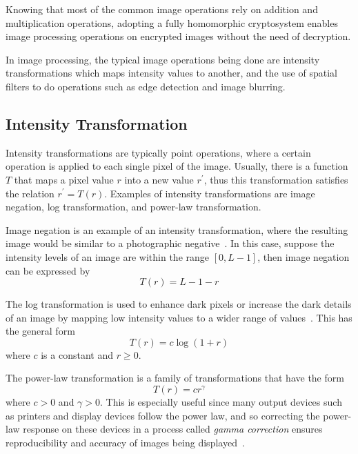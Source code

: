 Knowing that most of the common image operations rely on addition and multiplication operations, adopting a fully homomorphic cryptosystem enables image processing operations on encrypted images without the need of decryption.

In image processing, the typical image operations being done are intensity transformations which maps intensity values to another, and the use of spatial filters to do operations such as edge detection and image blurring. 

\subsection{Intensity Transformation}
Intensity transformations are typically point operations, where a certain operation is applied to each single pixel of the image. Usually, there is a function $T$ that maps a pixel value $r$ into a new value $r^\prime$, thus this transformation satisfies the relation $r^\prime = T\left(r\right)$. Examples of intensity transformations are image negation, log transformation, and power-law transformation.

Image negation is an example of an intensity transformation, where the resulting image would be similar to a photographic negative~\cite{gonzalez_digital_2008}. In this case, suppose the intensity levels of an image are within the range $\left[0, L-1\right]$, then image negation can be expressed by
\begin{equation}
    T\left(r\right) = L-1-r
\end{equation}

The log transformation is used to enhance dark pixels or increase the dark details of an image by mapping low intensity values to a wider range of values~\cite{gonzalez_digital_2008}. This has the general form
\begin{equation}
    T\left(r\right) = c \log\left(1 + r\right)
\end{equation}
where $c$ is a constant and $r \ge 0$.

The power-law transformation is a family of transformations that have the form
\begin{equation}
    T\left(r\right) = c r^{\gamma}
\end{equation}
where $c>0$ and $\gamma > 0$. This is especially useful since many output devices such as printers and display devices follow the power law, and so correcting the power-law response on these devices in a process called \textit{gamma correction} ensures reproducibility and accuracy of images being displayed~\cite{gonzalez_digital_2008}.

